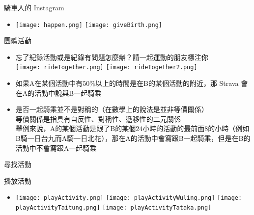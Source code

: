 \begin{frame}{騎車人的 Instagram}
\begin{itemize}
\item \texttt{[image: happen.png]}
\pause
\texttt{[image: giveBirth.png]}
\end{itemize}
\end{frame}

\begin{frame}{團體活動}
\begin{multicols}{2}
\begin{itemize}
\item 忘了紀錄活動或是紀錄有問題怎麼辦？請一起運動的朋友標注你\\
\texttt{[image: rideTogether.png]}
\texttt{[image: rideTogether2.png]}
\newpage
\item 如果A在某個活動中有$50\%$以上的時間是在B的某個活動的附近，那 Strava 會在A的活動中說與B一起騎乘
\item 是否一起騎乘並不是對稱的（在數學上的說法是並非等價關係）\\
{\tiny 等價關係是指具有自反性、對稱性、遞移性的二元關係}\\
舉例來說，A的某個活動是跟了B的某個$24$小時的活動的最前面$8$的小時（例如B騎一日台九而A騎一日北花），那在A的活動中會寫跟B一起騎乘，但是在B的活動中不會寫跟A一起騎乘
\end{itemize}
\end{multicols}
\end{frame}

\begin{frame}{尋找活動}
\begin{itemize}
\end{itemize}
\end{frame}

\begin{frame}{播放活動}
\begin{itemize}
\item \texttt{[image: playActivity.png]}
\texttt{[image: playActivityWuling.png]}
\texttt{[image: playActivityTaitung.png]}
\texttt{[image: playActivityTataka.png]}
\end{itemize}
\end{frame}

